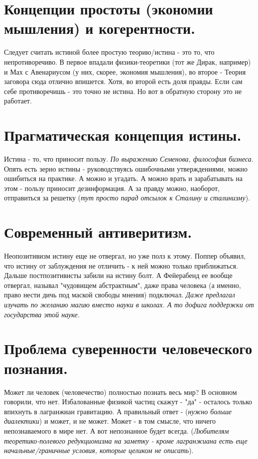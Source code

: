 \section{ Концепции простоты (экономии мышления) и когерентности.}
Следует считать истиной более простую теорию/истина - это то, что непротиворечиво. В первое впадали физики-теоретики (тот же Дирак, например) и Мах с Авенариусом (у них, скорее, экономия мышления), во второе - Теория заговора сюда отлично впишется. Хотя, во второй есть доля правды. Если сам себе противоречишь - это точно не истина. Но вот в обратную сторону это не работает.

\section{ Прагматическая концепция истины.}
Истина - то, что приносит пользу. \textit{По выражению Семенова, философия бизнеса.} Опять есть зерно истины - руководствуясь ошибочными утверждениями, можно ошибиться на практике. А можно и угадать. А можно врать и зарабатывать на этом - пользу приносит дезинформация. А за правду можно, наоборот, отправиться за решетку (\textit{тут просто парад отсылок к Сталину и сталинизму}). 

\section{ Современный антиверитизм.}
Неопозитивизм истину еще не отвергал, но уже полз к этому. Поппер объявил, что истину от заблуждения не отличить - к ней можно только приближаться. Дальше постпозитивисты забили на истину болт. А Фейерабенд ее вообще отвергал, называл "чудовищем абстрактным", даже права человека (а именно, право нести дичь под маской свободы мнения) подключал. \textit{Даже предлагал изучать по желанию магию вместо науки в школах. А то дофига поддержки от государства этой науке.}

\section{ Проблема суверенности человеческого познания.}
Может ли человек (человечество) полностью познать весь мир? В основном говорили, что нет. Избалованные физикой частиц скажут - "да" - осталось только впихнуть в лагранжиан гравитацию. А правильный ответ - (\textit{нужно больше диалектики}) и может, и не может. Может - в том смысле, что ничего непознаваемого в мире нет. А вот непознанное будет всегда. (\textit{Любителям теоретико-полевого редукционизма на заметку - кроме лагранжиана есть еще начальные/граничные условия, которые целиком не описать}).

